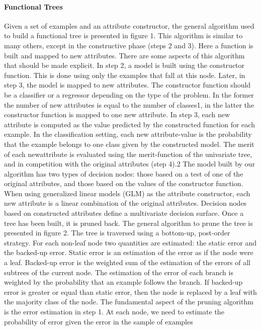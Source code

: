 \paragraph{Functional Trees}
Given a set of examples and an attribute constructor, the general algorithm used to build a
functional tree is presented in figure 1. This algorithm is similar to many others, except in the constructive phase (steps 2 and 3). Here a function is built and mapped to new attributes.
There are some aspects of this algorithm that should be made explicit. In step 2, a model
is built using the constructor function. This is done using only the examples that fall at
this node. Later, in step 3, the model is mapped to new attributes. The constructor function
should be a classifier or a regressor depending on the type of the problem. In the former
the number of new attributes is equal to the number of classes1, in the latter the constructor
function is mapped to one new attribute. In step 3, each new attribute is computed as the
value predicted by the constructed function for each example. In the classification setting,
each new attribute-value is the probability that the example belongs to one class given by
the constructed model.
The merit of each newattribute is evaluated using the merit-function of the univariate tree,
and in competition with the original attributes (step 4).2 The model built by our algorithm
has two types of decision nodes: those based on a test of one of the original attributes,
and those based on the values of the constructor function. When using generalized linear
models (GLM) as the attribute constructor, each new attribute is a linear combination of
the original attributes. Decision nodes based on constructed attributes define a multivariate
decision surface.
Once a tree has been built, it is pruned back. The general algorithm to prune the tree is
presented in figure 2. The tree is traversed using a bottom-up, post-order strategy. For each
non-leaf node two quantities are estimated: the static error and the backed-up error. Static
error is an estimation of the error as if the node were a leaf. Backed-up error is the weighted
sum of the estimation of the errors of all subtrees of the current node. The estimation of
the error of each branch is weighted by the probability that an example follows the branch.
If backed-up error is greater or equal than static error, then the node is replaced by a leaf
with the majority class of the node.
The fundamental aspect of the pruning algorithm is the error estimation in step 1. At each
node, we need to estimate the probability of error given the error in the sample of examples
